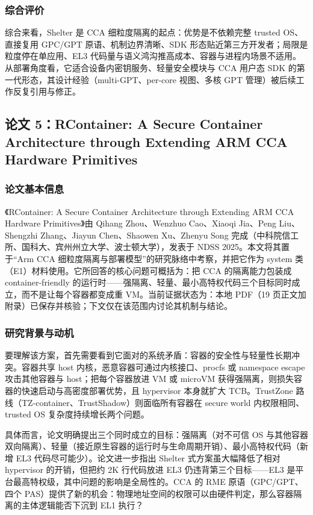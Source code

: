 \documentclass[11pt]{ctexart}
\begin{document}
\subsubsection{综合评价}
综合来看，Shelter 是 CCA 细粒度隔离的起点：优势是不依赖完整 trusted OS、直接复用 GPC/GPT 原语、机制边界清晰、SDK 形态贴近第三方开发者；局限是粒度停在单应用、EL3 代码量与语义鸿沟推高成本、容器与进程内场景不适用。从部署角度看，它适合设备内密钥服务、轻量安全模块与 CCA 用户态 SDK 的第一代形态，其设计经验（multi-GPT、per-core 视图、多核 GPT 管理）被后续工作反复引用与修正。\par

\subsection{论文 5：RContainer: A Secure Container Architecture through Extending ARM CCA Hardware Primitives}
\subsubsection{论文基本信息}
《RContainer: A Secure Container Architecture through Extending ARM CCA Hardware Primitives》由 Qihang Zhou、Wenzhuo Cao、Xiaoqi Jia、Peng Liu、Shengzhi Zhang、Jiayun Chen、Shaowen Xu、Zhenyu Song 完成（中科院信工所、国科大、宾州州立大学、波士顿大学），发表于 NDSS 2025。本文将其置于“Arm CCA 细粒度隔离与部署模型”的研究脉络中考察，并把它作为 system 类（E1）材料使用。它所回答的核心问题可概括为：把 CCA 的隔离能力包装成 container-friendly 的运行时——强隔离、轻量、最小高特权代码三个目标同时成立，而不是让每个容器都变成重 VM。当前证据状态为：本地 PDF（19 页正文加附录）已保存并核验；下文仅在该范围内讨论其机制与结论。\cite{zhou2025rcontainer}\par
\subsubsection{研究背景与动机}
要理解该方案，首先需要看到它面对的系统矛盾：容器的安全性与轻量性长期冲突。容器共享 host 内核，恶意容器可通过内核接口、procfs 或 namespace escape 攻击其他容器与 host；把每个容器放进 VM 或 microVM 获得强隔离，则损失容器的快速启动与高密度部署优势，且 hypervisor 本身就扩大 TCB。TrustZone 路线（TZ-container、TrustShadow）则面临所有容器在 secure world 内权限相同、trusted OS 复杂度持续增长两个问题。\par
具体而言，论文明确提出三个同时成立的目标：强隔离（对不可信 OS 与其他容器双向隔离）、轻量（接近原生容器的运行时与生命周期开销）、最小高特权代码（新增 EL3 代码尽可能少）。论文进一步指出 Shelter 式方案虽大幅降低了相对 hypervisor 的开销，但把约 2K 行代码放进 EL3 仍违背第三个目标——EL3 是平台最高特权级，其中问题的影响是全局性的。CCA 的 RME 原语（GPC/GPT、四个 PAS）提供了新的机会：物理地址空间的权限可以由硬件判定，那么容器隔离的主体逻辑能否下沉到 EL1 执行？\par
\end{document}
